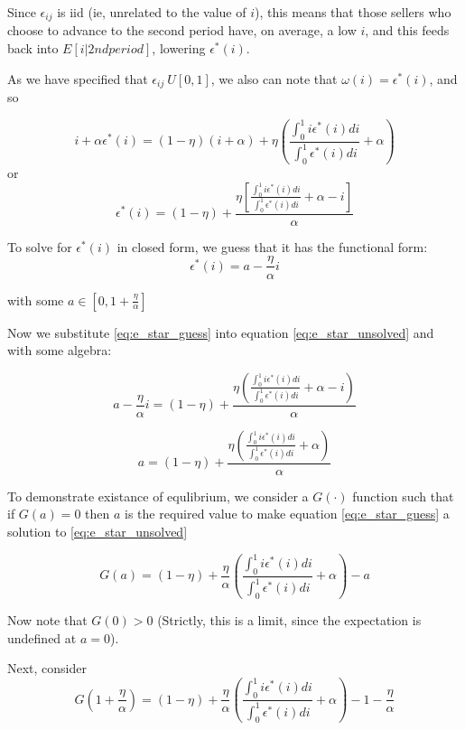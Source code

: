 \documentclass[AER]{AEA}
\begin{document}
Since $\epsilon_{ij}$ is iid (ie, unrelated to the value of $i$), this means that those sellers who choose to advance to the second period have, on average, a low $i$, and this feeds back into $E[i|2nd period] $, lowering  $\epsilon^* (i)$. 

As we have specified that $\epsilon_{ij} ~ U[0,1]$, we also can note that $\omega(i) = \epsilon^* (i)$, and so 


\begin{equation}
 i+\alpha \epsilon^*(i) = (1-\eta)(i+\alpha ) + \eta ( \frac{\int_0^1 i \epsilon^*(i) di}{\int_0^1  \epsilon^*(i) di} + \alpha) 
\end{equation}
or
\begin{equation} \label{eq:e_star_unsolved}
 \epsilon^*(i) = (1-\eta) + \frac{   \eta [ \frac{\int_0^1 i \epsilon^*(i) di}{\int_0^1  \epsilon^*(i) di} + \alpha -  i]}{\alpha} 
\end{equation}

To solve for $  \epsilon^*(i)$ in closed form, we guess that it has the functional form:
 \begin{equation} \label{eq:e_star_guess}
 \epsilon^*(i) = a-\frac{\eta }{\alpha}i
 \end{equation}
 
 with some  $a \in [0,1+\frac{\eta }{\alpha}]$

Now we substitute \ref{eq:e_star_guess} into equation \ref{eq:e_star_unsolved} and with some algebra:

$$a-\frac{\eta }{\alpha}i= (1-\eta) + \frac{   \eta ( \frac{\int_0^1 i \epsilon^*(i) di}{\int_0^1  \epsilon^*(i) di} + 
	\alpha -  i)}{\alpha}  $$

$$a= (1-\eta) + \frac{   \eta ( \frac{\int_0^1 i \epsilon^*(i) di}{\int_0^1  \epsilon^*(i) di} + 
	\alpha )}{\alpha}  $$

To demonstrate existance of equlibrium, we consider a $G(\cdot)$ function such that if $G(a) = 0$ then $a$ is the required value to make equation \ref{eq:e_star_guess} a solution to \ref{eq:e_star_unsolved}

\begin{equation} \label{eq:G_fxn}
G(a) = (1-\eta) + \frac{   \eta }{\alpha}( \frac{\int_0^1 i \epsilon^*(i) di}{\int_0^1  \epsilon^*(i) di} + \alpha ) - a
\end{equation}

Now note that $G(0) > 0$ (Strictly, this is a limit, since the expectation is undefined at $a = 0$). 

Next, consider 
$$G(1+\frac{\eta }{\alpha}) = (1-\eta) + \frac{   \eta }{\alpha}( \frac{\int_0^1 i \epsilon^*(i) di}{\int_0^1  \epsilon^*(i) di} + \alpha ) -1 -\frac{\eta }{\alpha}$$
\end{document}
